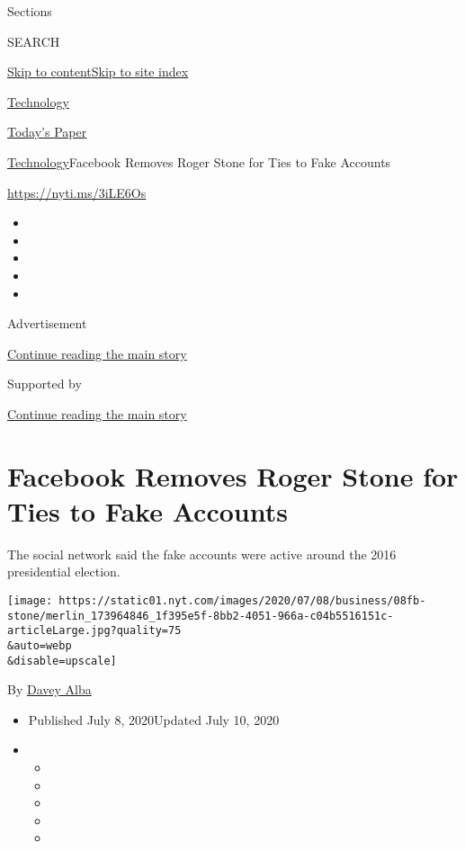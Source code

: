 Sections

SEARCH

\protect\hyperlink{site-content}{Skip to
content}\protect\hyperlink{site-index}{Skip to site index}

\href{https://www.nytimes.com/section/technology}{Technology}

\href{https://myaccount.nytimes.com/auth/login?response_type=cookie\&client_id=vi}{}

\href{https://www.nytimes.com/section/todayspaper}{Today's Paper}

\href{/section/technology}{Technology}\textbar{}Facebook Removes Roger
Stone for Ties to Fake Accounts

\url{https://nyti.ms/3iLE6Os}

\begin{itemize}
\item
\item
\item
\item
\item
\end{itemize}

Advertisement

\protect\hyperlink{after-top}{Continue reading the main story}

Supported by

\protect\hyperlink{after-sponsor}{Continue reading the main story}

\hypertarget{facebook-removes-roger-stone-for-ties-to-fake-accounts}{%
\section{Facebook Removes Roger Stone for Ties to Fake
Accounts}\label{facebook-removes-roger-stone-for-ties-to-fake-accounts}}

The social network said the fake accounts were active around the 2016
presidential election.

\texttt{[image: https://static01.nyt.com/images/2020/07/08/business/08fb-stone/merlin\_173964846\_1f395e5f-8bb2-4051-966a-c04b5516151c-articleLarge.jpg?quality=75\\\&auto=webp\\\&disable=upscale]}

By \href{https://www.nytimes.com/by/davey-alba}{Davey Alba}

\begin{itemize}
\item
  Published July 8, 2020Updated July 10, 2020
\item
  \begin{itemize}
  \item
  \item
  \item
  \item
  \item
  \end{itemize}
\end{itemize}

